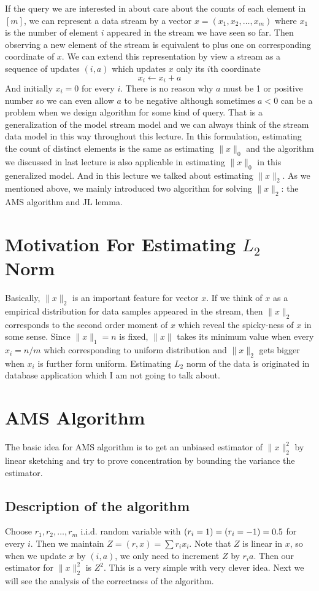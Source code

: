 \documentclass[11pt]{article}
\let\Pr\relax
\DeclareMathOperator*{\Pr}{\mathbb{P}}
\begin{document}
If the query we are interested in about care about the counts of each element in $[m]$, we can represent a data stream by a vector $x = (x_1, x_2, \ldots, x_m)$ where $x_1$ is the number of element $i$ appeared in the stream we have seen so far. Then observing a new element of the stream is equivalent to plus one on corresponding coordinate of $x$. We can extend this representation by view a stream as a sequence of updates $(i, a)$ which updates $x$ only its $i$th coordinate
$$ x_i \leftarrow x_i + a $$
And initially $x_i = 0$ for every $i$. There is no reason why $a$ must be 1 or positive number so we can even allow $a$ to be negative although sometimes $a < 0$ can be a problem when we design algorithm for some kind of query. That is a generalization of the model stream model and we can always think of the stream data model in this way throughout this lecture. In this formulation, estimating the count of distinct elements is the same as estimating $\| x \|_0$ and the algorithm we discussed in last lecture is also applicable in estimating $\|x \|_0$ in this generalized model. And in this lecture we talked about estimating $\| x\|_2$. As we mentioned above, we mainly introduced two algorithm for solving $\| x \|_2$: the AMS algorithm and JL lemma. 

\section{Motivation For Estimating $L_2$ Norm}
Basically, $\| x \|_2$ is an important feature for vector $x$. If we think of $x$ as a empirical distribution for data samples appeared in the stream, then $\| x \|_2$ corresponds to the second order moment of $x$ which reveal the spicky-ness of $x$ in some sense. Since $\|x\|_1 = n$ is fixed, $\| x \|$ takes its minimum value when every $x_i = n/m$ which corresponding to uniform distribution and $\| x \|_2$ gets bigger when $x_i$ is further form uniform. Estimating $L_2$ norm of the data is originated in database application which I am not going to talk about. 

\section{AMS Algorithm}
The basic idea for AMS algorithm is to get an unbiased estimator of $\|x\|^2_2$ by linear sketching and try to prove concentration by bounding the variance the estimator. 

\subsection{Description of the algorithm}
Choose $r_1, r_2, \ldots, r_m$ i.i.d. random variable with $\Pr(r_i = 1) = \Pr(r_i = -1) = 0.5$ for every $i$. Then we maintain $Z = (r, x) = \sum r_ix_i$. Note that $Z$ is linear in $x$, so when we update $x$ by $(i, a)$, we only need to increment $Z$ by $r_ia$. Then our estimator for $\|x\|^2_2$ is $Z^2$. This is a very simple with very clever idea. Next we will see the analysis of the correctness of the algorithm.
\end{document}
